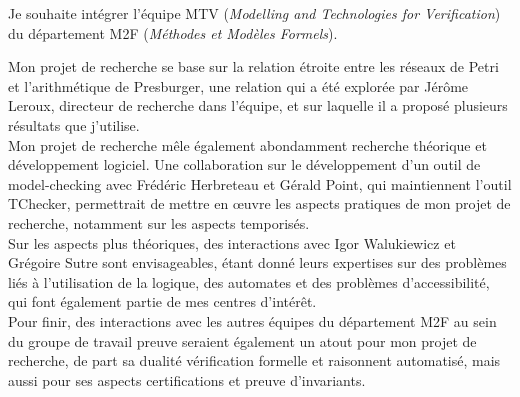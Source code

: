 Je souhaite intégrer l'équipe MTV (\emph{Modelling and Technologies for
Verification}) du département M2F (\emph{Méthodes et Modèles Formels}).

Mon projet de recherche se base sur la relation étroite entre les réseaux de
Petri et l'arithmétique de Presburger, une relation qui a été explorée par 
Jérôme Leroux, directeur de recherche dans l'équipe, et sur laquelle il a proposé
plusieurs résultats que j'utilise.\\

Mon  projet de recherche mêle également abondamment recherche théorique et
développement logiciel. Une collaboration sur le développement d'un outil de
model-checking avec Frédéric Herbreteau et Gérald Point, qui maintiennent
l'outil TChecker, permettrait de mettre en œuvre les aspects pratiques de mon
projet de recherche, notamment sur les aspects temporisés.\\

Sur les aspects plus théoriques, des interactions avec Igor
Walukiewicz et Grégoire Sutre sont envisageables, étant donné leurs expertises
sur des problèmes liés à l'utilisation de la logique, des automates et des
problèmes d'accessibilité, qui font également partie de mes centres d'intérêt.\\

Pour finir, des interactions avec les autres équipes du département M2F au sein
du groupe de travail \og preuve \fg seraient également un atout pour mon projet
de recherche, de part sa dualité vérification formelle et raisonnent automatisé,
mais aussi pour ses aspects certifications et preuve d'invariants.
